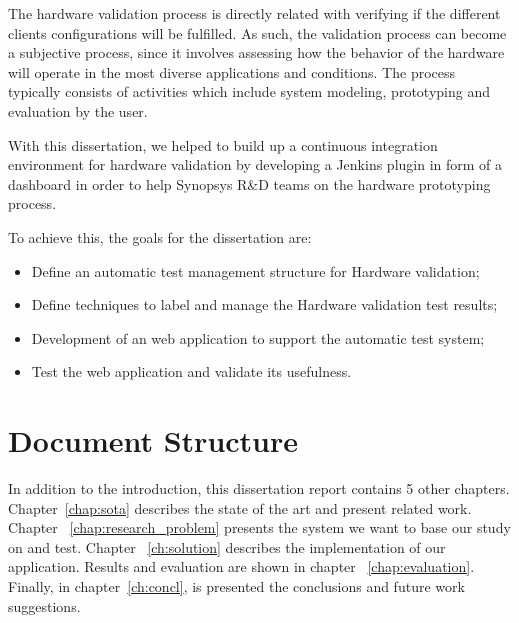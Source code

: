 The hardware validation process is directly related with verifying if the different clients configurations will be fulfilled. As such, the validation process can become a subjective process, since it involves assessing how the behavior of the hardware will operate in the most diverse applications and conditions. The process typically consists of activities which include system modeling, prototyping and evaluation by the user.

With this dissertation, we helped to build up a continuous integration environment for hardware validation by developing a Jenkins plugin in form of a dashboard in order to help Synopsys R\&D teams on the hardware prototyping process. 

To achieve this, the goals for the dissertation are:

\begin{itemize}
\item Define an automatic test management structure for Hardware validation;
\item Define techniques to label and manage the Hardware validation test results;
\item Development of an web application to support the automatic test system;
\item Test the web application and validate its usefulness.
\end{itemize}

\section{Document Structure} \label{sec:struct}

In addition to the introduction, this dissertation report contains 5 other chapters. 
Chapter~\ref{chap:sota} describes the state of the art and present related work.
Chapter ~\ref{chap:research_problem} presents the system we want to base our study on and test.
Chapter ~\ref{ch:solution} describes the implementation of our application.
Results and evaluation are shown in chapter ~\ref{chap:evaluation}.
Finally, in chapter~\ref{ch:concl}, is presented the conclusions and future work suggestions.
